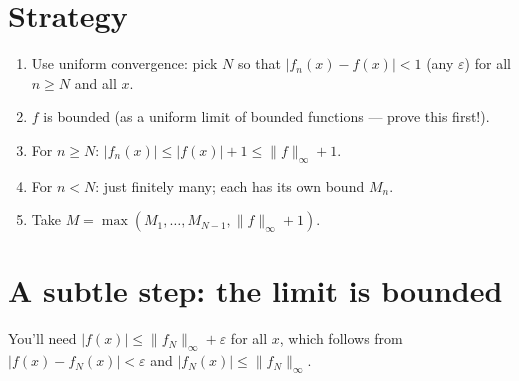 \documentclass[12pt]{article}
\begin{document}
\section*{Strategy}
\begin{enumerate}
  \item Use uniform convergence: pick $N$ so that $|f_n(x) - f(x)| < 1$ (any $\varepsilon$) for all $n \geq N$ and all $x$.
  \item $f$ is bounded (as a uniform limit of bounded functions --- prove this first!).
  \item For $n \geq N$: $|f_n(x)| \leq |f(x)| + 1 \leq \|f\|_\infty + 1$.
  \item For $n < N$: just finitely many; each has its own bound $M_n$.
  \item Take $M = \max(M_1, \ldots, M_{N-1}, \|f\|_\infty + 1)$.
\end{enumerate}

\section*{A subtle step: the limit is bounded}
You'll need $|f(x)| \leq \|f_N\|_\infty + \varepsilon$ for all $x$, which follows from $|f(x) - f_N(x)| < \varepsilon$ and $|f_N(x)| \leq \|f_N\|_\infty$.
\end{document}
